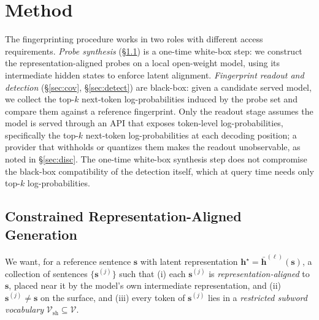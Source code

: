 \documentclass[11pt]{article}
\newcommand{\V}{\mathcal{V}}
\newcommand{\Vsh}{\mathcal{V}_{\mathrm{sh}}}
\theoremstyle{definition}
\begin{document}
\section{Method}
\label{sec:method}

The fingerprinting procedure works in two roles with different access
requirements. \emph{Probe synthesis} (\S\ref{sec:syn}) is a one-time
white-box step: we construct the representation-aligned probes on a local
open-weight model, using its intermediate hidden states to enforce latent
alignment. \emph{Fingerprint readout and detection} (\S\ref{sec:cov},
\S\ref{sec:detect}) are black-box: given a candidate served model, we collect
the top-$k$ next-token log-probabilities induced by the probe set and compare
them against a reference fingerprint. Only the readout stage assumes the model
is served through an API that exposes token-level log-probabilities, specifically
the top-$k$ next-token log-probabilities at each decoding position; a provider
that withholds or quantizes them makes the readout unobservable, as noted in
\S\ref{sec:disc}. The one-time white-box synthesis step does not compromise the
black-box compatibility of the detection itself, which at query time needs only
top-$k$ log-probabilities.

\subsection{Constrained Representation-Aligned Generation}
\label{sec:syn}

We want, for a reference sentence $\bm{s}$ with latent representation
$\bm{h}^\star = \bar{\bm{h}}^{(\ell)}(\bm{s})$, a collection of sentences
$\{\bm{s}^{(j)}\}$ such that (i) each $\bm{s}^{(j)}$ is
\emph{representation-aligned} to $\bm{s}$, placed near it by the model's own
intermediate representation, and (ii) $\bm{s}^{(j)} \ne \bm{s}$ on
the surface, and (iii) every token of $\bm{s}^{(j)}$ lies in a
\emph{restricted subword vocabulary} $\Vsh \subseteq \V$.
\end{document}
